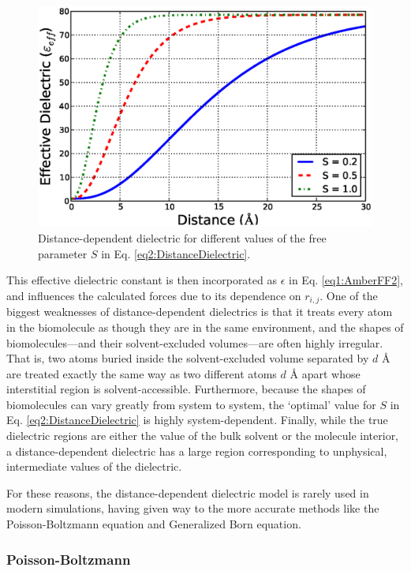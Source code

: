 \begin{figure}
   \includegraphics[width=6.5in]{DistanceDielectric.ps}
   \caption{Distance-dependent dielectric for different values of the free
            parameter $S$ in Eq. \ref{eq2:DistanceDielectric}.}
   \label{fig2:DistanceDielectric}
\end{figure}

This effective dielectric constant is then incorporated as $\epsilon$ in Eq.
\ref{eq1:AmberFF2}, and influences the calculated forces due to its dependence
on $r_{i,j}$. One of the biggest weaknesses of distance-dependent
dielectrics is that it treats every atom in the biomolecule as though they are
in the same environment, and the shapes of biomolecules---and their
solvent-excluded volumes---are often highly irregular. That is, two atoms buried
inside the solvent-excluded volume separated by $d$ {\AA} are treated exactly
the same way as two different atoms $d$ {\AA} apart whose interstitial region is
solvent-accessible. Furthermore, because the shapes of biomolecules can vary
greatly from system to system, the `optimal' value for $S$ in Eq.
\ref{eq2:DistanceDielectric} is highly system-dependent. Finally, while the true
dielectric regions are either the value of the bulk solvent or the molecule
interior, a distance-dependent dielectric has a large region corresponding to
unphysical, intermediate values of the dielectric.

For these reasons, the distance-dependent dielectric model is rarely used in
modern simulations, having given way to the more accurate methods like the
Poisson-Boltzmann equation and Generalized Born equation.

\subsubsection{Poisson-Boltzmann}

